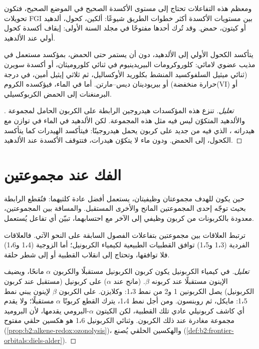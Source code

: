 ومعظم هذه التفاعلات تحتاج إلى مستوى الأكسدة الصحيح في الموضع الصحيح، فتكون تحويلات FGI بين مستويات
الأكسدة أكثر خطوات الطريق شيوعًا: ألكين، كحول، ألدهيد أو كيتون، حمض. وقد تُرك أحدها
مفتوحًا في مجلد السنة الأولى: إيقاف أكسدة كحول أولي عند الألدهيد.

\begin{proposition}\label{prop:b2:retrosynthesis:mild-oxidation}
يتأكسد الكحول الأولي إلى الألدهيد، دون أن يستمر حتى الحمض، بمؤكسد مستعمل في
مذيب عضوي لامائي: كلوروكرومات البيريدينيوم في ثنائي كلوروميثان، أو أكسدة سويرن (ثنائي ميثيل
السلفوكسيد المنشط بكلوريد الأوكساليل، ثم ثلاثي إيثيل أمين، في درجة حرارة منخفضة) أو بيريودينان
ديس--مارتن. أما في الماء، فيؤكسده الكروم(VI) أو البرمنغنات إلى الحمض الكربوكسيلي.
\end{proposition}

\begin{proof}[تعليل]
تنزع هذه المؤكسدات هيدروجين الرابطة  على الكربون الحامل لمجموعة . والألدهيد
المتكوّن ليس فيه مثل هذه المجموعة. لكن الألدهيد في الماء في توازن مع هيدراته
، الذي فيه من جديد  على كربون يحمل هيدروجينًا: فيتأكسد الهيدرات
كما يتأكسد الكحول، إلى الحمض. ودون ماء لا يتكوّن هيدرات، فتتوقف الأكسدة عند
الألدهيد.
\end{proof}

\section{الفك عند مجموعتين}

حين يكون للهدف مجموعتان وظيفيتان، يستعمل أفضل  عادة كلتيهما: فتُقطع الرابطة
بحيث توجّه إحدى المجموعتين المانح والأخرى المستقبل. والمسافة بين المجموعتين،
معدودة بالكربونات من كربون وظيفي إلى الآخر مع احتسابهما، تبيّن أي تفاعل يُستعمل.

\begin{proposition}\label{prop:b2:retrosynthesis:patterns}
ترتبط العلاقات بين مجموعتين بتفاعلات الفصول السابقة على النحو الآتي. فالعلاقات
الفردية (1،3 و1،5) توافق القطبيات الطبيعية لكيمياء الكربونيل؛ أما الزوجية (1،4
و1،6) فلا توافقها، وتحتاج إلى انقلاب القطبية أو إلى شطر حلقة.
\end{proposition}


\begin{proof}[تعليل]
في كيمياء الكربونيل يكون كربون الكربونيل مستقبلًا والكربون $\alpha$ مانحًا، ويضيف الإينون
مستقبلًا عند كربونه $\beta$.  (مانح عند $\alpha$) على كربونيل (مستقبل عند كربون
الكربونيل) يصل الكربونين 1 و2 من نمط 1،3:  وكلايزن.  على الكربون $\beta$
لإينون يبني نمط 1،5: مايكل، ثم روبنسون. ومن أجل نمط 1،4، يترك القطع
كربونًا $\alpha$ مستقبلًا؛ ولا يقدم أي كاشف كربونيلي عادي تلك القطبية، لكن الكيتون $\alpha$-البرومي
يقدمها، لأن البروميد مجموعة مغادرة عند ذلك الكربون. وثنائي الكربونيل 1،6 هو هكسين حلقي مفتوح
 (\cref{prop:b2:alkene-redox:ozonolysis})، والهكسين الحلقي يُصنع 
(\cref{def:b2:frontier-orbitals:diels-alder}).
\end{proof}

